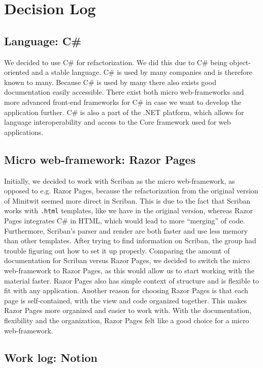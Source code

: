 \section{Decision Log}
\label{appendix:decision-log}
\subsection{Language: C\#}

We decided to use C\# for refactorization. We did this due to C\# being object-oriented and a stable language. C\# is used by many companies and is therefore known to many. Because C\# is used by many there also exists good documentation easily accessible.
There exist both micro web-frameworks and more advanced front-end frameworks for C\# in case we want to develop the application further.
C\# is also a part of the .NET platform, which allows for language interoperability and access to the Core framework used for web applications.

\subsection{Micro web-framework: Razor Pages}

Initially, we decided to work with Scriban as the micro web-framework, as opposed to e.g. Razor Pages, because the refactorization from the original version of Minitwit seemed more direct in Scriban. This is due to the fact that Scriban works with \texttt{.html} templates, like we have in the original version, whereas Razor Pages integrates C\# in HTML, which would lead to more “merging” of code.
Furthermore, Scriban's parser and render are both faster and use less memory than other templates.
After trying to find information on Scriban, the group had trouble figuring out how to set it up properly. Comparing the amount of documentation for Scriban versus Razor Pages, we decided to switch the micro web-framework to Razor Pages, as this would allow us to start working with the material faster.
Razor Pages also has simple context of structure and is flexible to fit with any application. Another reason for choosing Razor Pages is that each page is self-contained, with the view and code organized together. This makes Razor Pages more organized and easier to work with. With the documentation, flexibility and the organization, Razor Pages felt like a good choice for a micro web-framework.

\subsection{Work log: Notion}

